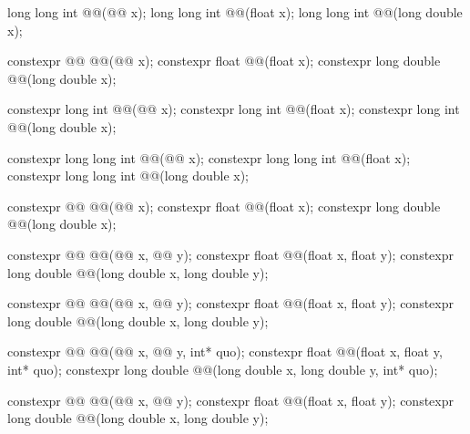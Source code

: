 \begin{codeblock}
{  long long int @@(@@ x);
  long long int @@(float x);
  long long int @@(long double x);

  constexpr @@ @@(@@ x);
  constexpr float               @@(float x);
  constexpr long double         @@(long double x);

  constexpr long int @@(@@ x);
  constexpr long int @@(float x);
  constexpr long int @@(long double x);

  constexpr long long int @@(@@ x);
  constexpr long long int @@(float x);
  constexpr long long int @@(long double x);

  constexpr @@ @@(@@ x);
  constexpr float               @@(float x);
  constexpr long double         @@(long double x);

  constexpr @@ @@(@@ x, @@ y);
  constexpr float               @@(float x, float y);
  constexpr long double         @@(long double x, long double y);

  constexpr @@ @@(@@ x, @@ y);
  constexpr float               @@(float x, float y);
  constexpr long double         @@(long double x, long double y);

  constexpr @@ @@(@@ x, @@ y, int* quo);
  constexpr float               @@(float x, float y, int* quo);
  constexpr long double         @@(long double x, long double y, int* quo);

  constexpr @@ @@(@@ x, @@ y);
  constexpr float               @@(float x, float y);
  constexpr long double         @@(long double x, long double y);

}
\end{codeblock}
